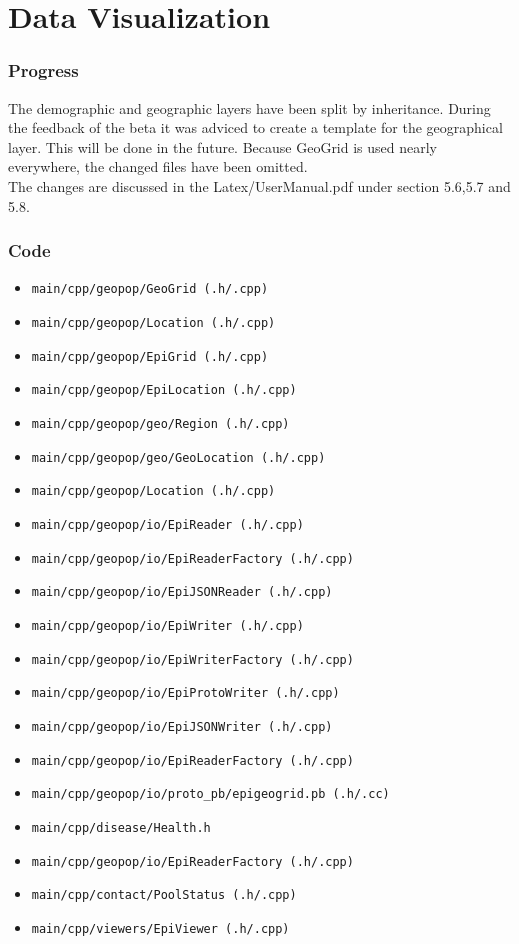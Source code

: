 \documentclass[runningheads]{llncs}
\begin{document}
\section{Data Visualization}

\subsubsection{Progress}
The demographic and geographic layers have been split by inheritance. During the feedback of the beta it was adviced to create a template for the geographical layer. This will be done in the future. Because GeoGrid is used nearly everywhere, the changed files have been omitted. \\
The changes are discussed in the Latex/UserManual.pdf under section 5.6,5.7 and 5.8.
\subsubsection{Code}
	\begin{itemize}
		\item \texttt{main/cpp/geopop/GeoGrid (.h/.cpp)}
		\item \texttt{main/cpp/geopop/Location (.h/.cpp)}
		\item \texttt{main/cpp/geopop/EpiGrid (.h/.cpp)}
		\item \texttt{main/cpp/geopop/EpiLocation (.h/.cpp)}
		\item \texttt{main/cpp/geopop/geo/Region (.h/.cpp)}
		\item \texttt{main/cpp/geopop/geo/GeoLocation (.h/.cpp)}
		\item \texttt{main/cpp/geopop/Location (.h/.cpp)}
		\item \texttt{main/cpp/geopop/io/EpiReader (.h/.cpp)}
		\item \texttt{main/cpp/geopop/io/EpiReaderFactory (.h/.cpp)}
		\item \texttt{main/cpp/geopop/io/EpiJSONReader (.h/.cpp)}
		\item \texttt{main/cpp/geopop/io/EpiWriter (.h/.cpp)}
		\item \texttt{main/cpp/geopop/io/EpiWriterFactory (.h/.cpp)}
		\item \texttt{main/cpp/geopop/io/EpiProtoWriter (.h/.cpp)}
		\item \texttt{main/cpp/geopop/io/EpiJSONWriter (.h/.cpp)}
		\item \texttt{main/cpp/geopop/io/EpiReaderFactory (.h/.cpp)}
		\item \texttt{main/cpp/geopop/io/proto\_pb/epigeogrid.pb (.h/.cc)}
		\item \texttt{main/cpp/disease/Health.h}
		\item \texttt{main/cpp/geopop/io/EpiReaderFactory (.h/.cpp)}
		\item \texttt{main/cpp/contact/PoolStatus (.h/.cpp)}
		\item \texttt{main/cpp/viewers/EpiViewer (.h/.cpp)}
	\end{itemize}
\end{document}
